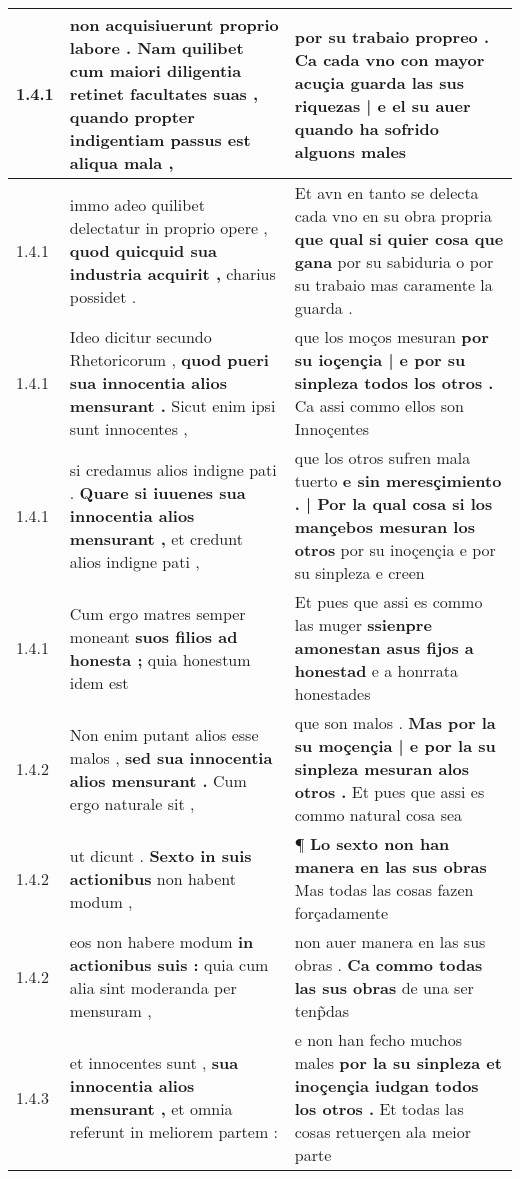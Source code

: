 \begin{tabular}{|p{1cm}|p{6.5cm}|p{6.5cm}|}
1.4.1 & non acquisiuerunt proprio labore . \textbf{ Nam quilibet cum maiori diligentia retinet facultates suas , } quando propter indigentiam passus est aliqua mala , & por su trabaio propreo . \textbf{ Ca cada vno con mayor acuçia guarda las sus riquezas | e el su auer } quando ha sofrido alguons males \\\hline
1.4.1 & immo adeo quilibet delectatur in proprio opere , \textbf{ quod quicquid sua industria acquirit , } charius possidet . & Et avn en tanto se delecta cada vno en su obra propria \textbf{ que qual si quier cosa que gana } por su sabiduria o por su trabaio mas caramente la guarda . \\\hline
1.4.1 & Ideo dicitur secundo Rhetoricorum , \textbf{ quod pueri sua innocentia alios mensurant . } Sicut enim ipsi sunt innocentes , & que los moços mesuran \textbf{ por su ioçençia | e por su sinpleza todos los otros . } Ca assi commo ellos son Innoçentes \\\hline
1.4.1 & si credamus alios indigne pati . \textbf{ Quare si iuuenes sua innocentia alios mensurant , } et credunt alios indigne pati , & que los otros sufren mala tuerto \textbf{ e sin meresçimiento . | Por la qual cosa si los mançebos mesuran los otros } por su inoçençia e por su sinpleza e creen \\\hline
1.4.1 & Cum ergo matres semper moneant \textbf{ suos filios ad honesta ; } quia honestum idem est & Et pues que assi es commo las muger \textbf{ ssienpre amonestan asus fijos a honestad } e a honrrata honestades \\\hline
1.4.2 & Non enim putant alios esse malos , \textbf{ sed sua innocentia alios mensurant . } Cum ergo naturale sit , & que son malos . \textbf{ Mas por la su moçençia | e por la su sinpleza mesuran alos otros . } Et pues que assi es commo natural cosa sea \\\hline
1.4.2 & ut dicunt . \textbf{ Sexto in suis actionibus } non habent modum , & ¶ \textbf{ Lo sexto non han manera en las sus obras } Mas todas las cosas fazen forçadamente \\\hline
1.4.2 & eos non habere modum \textbf{ in actionibus suis : } quia cum alia sint moderanda per mensuram , & non auer manera en las sus obras . \textbf{ Ca commo todas las sus obras } de una ser tenp̃das \\\hline
1.4.3 & et innocentes sunt , \textbf{ sua innocentia alios mensurant , } et omnia referunt in meliorem partem : & e non han fecho muchos males \textbf{ por la su sinpleza et inoçençia iudgan todos los otros . } Et todas las cosas retuerçen ala meior parte \\\hline

\end{tabular}
